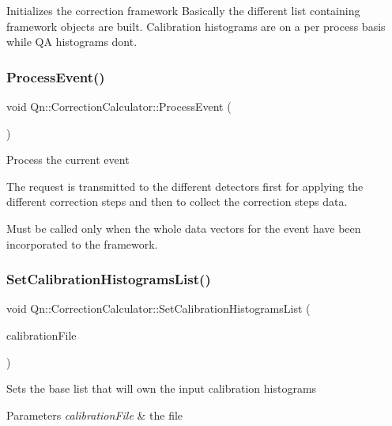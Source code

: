 Initializes the correction framework Basically the different list containing framework objects are built. Calibration histograms are on a per process basis while QA histograms don\textquotesingle{}t. \mbox{\label{classQn_1_1CorrectionCalculator_abd87637ad85b843ff19877814d2dddd4}} 
\subsubsection{\texorpdfstring{Process\+Event()}{ProcessEvent()}}
{\footnotesize\ttfamily void Qn\+::\+Correction\+Calculator\+::\+Process\+Event (\begin{DoxyParamCaption}{ }\end{DoxyParamCaption})\hspace{0.3cm}{\ttfamily [inline]}}

Process the current event

The request is transmitted to the different detectors first for applying the different correction steps and then to collect the correction steps data.

Must be called only when the whole data vectors for the event have been incorporated to the framework. \mbox{\label{classQn_1_1CorrectionCalculator_a62057548ca452e31e76ff98c9e5b6fd0}} 
\subsubsection{\texorpdfstring{Set\+Calibration\+Histograms\+List()}{SetCalibrationHistogramsList()}}
{\footnotesize\ttfamily void Qn\+::\+Correction\+Calculator\+::\+Set\+Calibration\+Histograms\+List (\begin{DoxyParamCaption}\item[{T\+File $\ast$}]{calibration\+File }\end{DoxyParamCaption})}

Sets the base list that will own the input calibration histograms 
\begin{DoxyParams}{Parameters}
{\em calibration\+File} & the file \\
\hline
\end{DoxyParams}
\mbox{\label{classQn_1_1CorrectionCalculator_a74c96c14696e8221ec839d7c8b5f773b}} 
